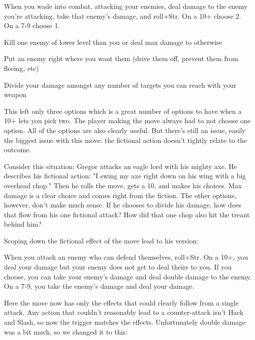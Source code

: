        
\startExample
When you wade into combat, attacking your enemies, deal damage to the enemy you’re attacking, take that enemy’s damage, and roll+Str. On a 10+ choose 2. On a 7-9 choose 1.
\stopExample
       
\startitemize[1,packed]
         
\item Kill one enemy of lower level than you or deal max damage to otherwise

         
\item Put an enemy right where you want them (drive them off, prevent them from fleeing, etc)

         
\item Divide your damage amongst any number of targets you can reach with your weapon

       
\stopitemize
       

This left only three options which is a great number of options to have when a 10+ lets you pick two. The player making the move always had to not choose one option. All of the options are also clearly useful. But there's still an issue, easily the biggest issue with this move: the fictional action doesn't tightly relate to the outcome.

       

Consider this situation: Gregor attacks an eagle lord with his mighty axe. He describes his fictional action: "I swing my axe right down on his wing with a big overhead chop." Then he rolls the move, gets a 10, and makes his choices. Max damage is a clear choice and comes right from the fiction. The other options, however, don't make much sense. If he chooses to divide his damage, how does that flow from his one fictional attack? How did that one chop also hit the treant behind him?

       

Scoping down the fictional effect of the move lead to his version:

       
\startExample
When you attack an enemy who can defend themselves, roll+Str. On a 10+, you deal your damage but your enemy does not get to deal theirs to you. If you choose, you can take your enemy's damage and deal double damage to the enemy. On a 7-9, you take the enemy's damage and deal your damage.
\stopExample
       

Here the move now has only the effects that could clearly follow from a single attack. Any action that couldn't reasonably lead to a counter-attack isn't Hack and Slash, so now the trigger matches the effects. Unfortunately double damage was a bit much, so we changed it to this:


